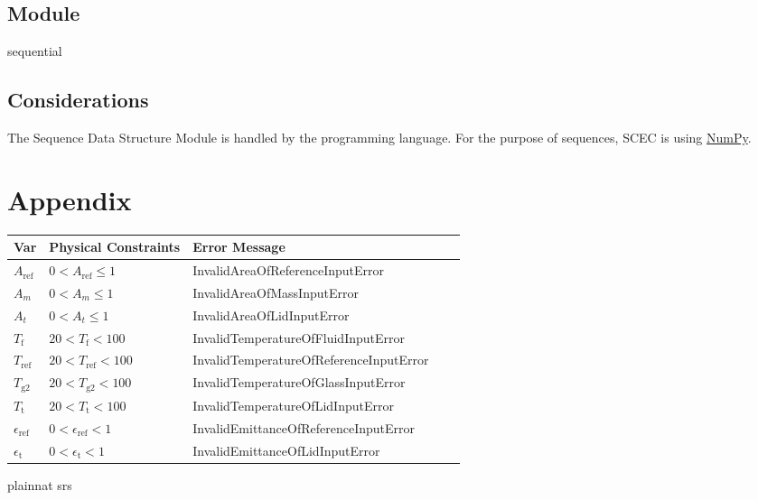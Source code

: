 \documentclass[12pt, titlepage]{article}
\begin{document}
\subsection{Module}

sequential


\subsection{Considerations}

The Sequence Data Structure Module is handled by the programming language. For the purpose of sequences, SCEC is using \href{https://numpy.org}{NumPy}.   

\newpage
\section{Appendix} \label{Appendix}

\begin{table}[!h]
  \caption{Possible errors for input} \label{verify_input}
  \renewcommand{\arraystretch}{1.2}
\noindent \begin{longtable*}{l l l l c} 
  \toprule
  \textbf{Var} & \textbf{Physical Constraints} & \textbf{Error Message} \\
  \midrule 

 $A_\text{ref}$ & $0 < A_\text{ref} \le 1$ & InvalidAreaOfReferenceInputError \\
  $A_m$ & $0 < A_m \le 1 $ & InvalidAreaOfMassInputError \\
  $A_t$ & $0 < A_t \le 1 $ & InvalidAreaOfLidInputError \\
  $T_\text{f}$ & $20 < T_\text{f} < 100$ & InvalidTemperatureOfFluidInputError\\
  $T_\text{ref}$ & $20 < T_\text{ref} < 100$ &InvalidTemperatureOfReferenceInputError \\
  $T_\text{g2}$ & $20 < T_\text{g2} < 100$ &InvalidTemperatureOfGlassInputError \\
  $T_\text{t}$ & $20 < T_\text{t} < 100$ & InvalidTemperatureOfLidInputError\\
  $\epsilon_\text{ref}$ & $0 < \epsilon_\text{ref} < 1$ & InvalidEmittanceOfReferenceInputError\\
   $\epsilon_\text{t}$ & $0 < \epsilon_\text{t} < 1$ & InvalidEmittanceOfLidInputError \\
  
  \bottomrule
\end{longtable*}
\end{table}

\newpage
 {plainnat}
 {srs}
\end{document}
